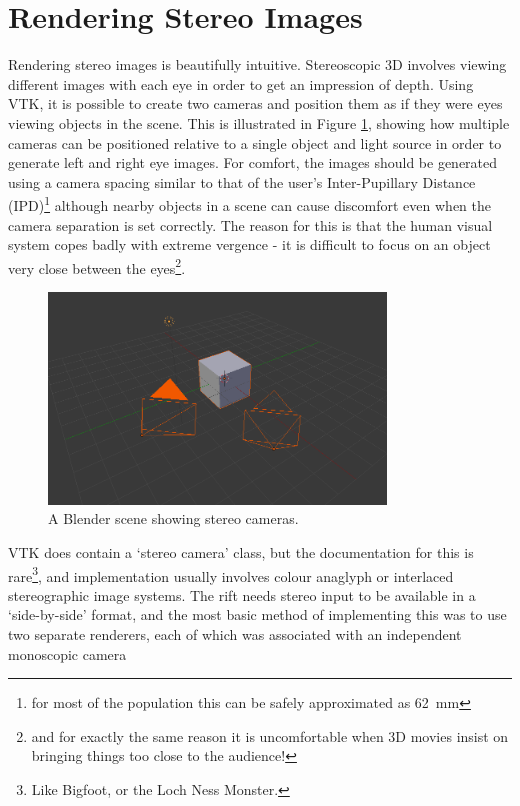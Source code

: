 \documentclass[MSc,paper=a4,pagesize=auto]{icldt}
\begin{document}
\clearpage
\section{Rendering Stereo Images}
Rendering stereo images is beautifully intuitive. Stereoscopic 3D involves viewing different images with each eye in order to get an impression of depth. Using VTK, it is possible to create two cameras and position them as if they were eyes viewing objects in the scene. This is illustrated in Figure \ref{fig:simple_scene}, showing how multiple cameras can be positioned relative to a single object and light source in order to generate left and right eye images. For comfort, the images should be generated using a camera spacing similar to that of the user's Inter-Pupillary Distance (IPD)\footnote{for most of the population this can be safely approximated as \SI{62}{\mm}} although nearby objects in a scene can cause discomfort even when the camera separation is set correctly. The reason for this is that the human visual system copes badly with extreme vergence - it is difficult to focus on an object very close between the eyes\footnote{and for exactly the same reason it is uncomfortable when 3D movies insist on bringing things too close to the audience!}. 

\begin{figure}[htbp!]
    \centering
    \includegraphics[width=0.8\textwidth]{resources/simple_scene}
    \caption{A Blender scene showing stereo cameras.}
    \label{fig:simple_scene}
\end{figure}


VTK does contain a `stereo camera' class, but the documentation for this is rare\footnote{Like Bigfoot, or the Loch Ness Monster.}, and implementation usually involves colour anaglyph or interlaced stereographic image systems. The rift needs stereo input to be available in a `side-by-side' format, and the most basic method of implementing this was to use two separate renderers, each of which was associated with an independent monoscopic camera 
\end{document}
